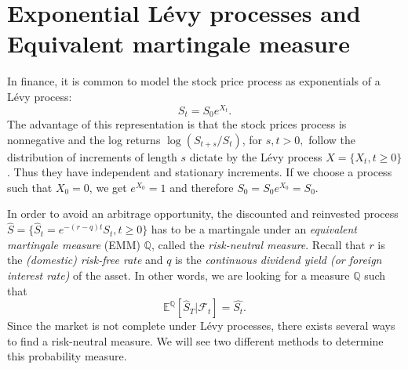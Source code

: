 \section{Exponential L\'evy processes and Equivalent martingale measure}
\label{sec:Levy:exponential_processes}

In finance, it is common to model the stock price process as exponentials of a L\'evy process:
$$S_t = S_0 e^{X_t}. $$
The advantage of this representation is that the stock prices process is nonnegative and the log returns $\log(S_{t+s}/S_t)$, for $s,t>0,$ follow the distribution of increments of length $s$ dictate by the L\'evy process $X=\{X_t,t\geq0\}$. Thus they have independent and stationary increments. If we choose a process such that $X_0=0$, we get $e^{X_0}=1$ and therefore $S_0=S_0e^{X_0}=S_0$. 

In order to avoid an arbitrage opportunity, the discounted and reinvested process $\hat{S}=\{\hat{S}_t = e^{-(r-q)t}S_t,t\geq0\}$ has to be a martingale under an \textit{equivalent martingale measure} (EMM) $\mathbb{Q}$, called the \textit{risk-neutral measure}. Recall that $r$ is the \textit{(domestic) risk-free rate} and $q$ is the \textit{continuous dividend yield (or foreign interest rate)} of the asset. In other words, we are looking for a measure $\mathbb{Q}$ such that
$$\mathbb{E}^\mathbb{Q}\left[\hat{S}_T|\mathcal{F}_t\right]=\hat{S_t}.$$
Since the market is not complete under L\'evy processes, there exists several ways to find a risk-neutral measure. We will see two different methods to determine this probability measure.

